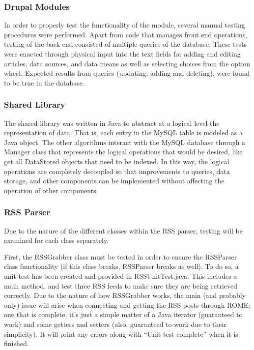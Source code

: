 \documentclass[11pt]{article} %
\begin{document}
\subsubsection{Drupal Modules}

In order to properly test the functionality of the module, several manual testing procedures were performed. Apart from code that manages front end operations, testing of the back end consisted of multiple queries of the database. These tests were enacted through physical input into the text fields for adding and editing articles, data sources, and data means as well as selecting choices from the option wheel. Expected results from queries (updating, adding and deleting), were found to be true in the database. 

\subsubsection{Shared Library}

The shared library was written in Java to abstract at a logical level the representation of data. That is, each entry in the MySQL table is modeled as a Java object. The other algorithms interact with the MySQL database through a Manager class that represents the logical operations that would be desired, like get all DataStored objects that need to be indexed. In this way, the logical operations are completely decoupled so that improvements to queries, data storage, and other components can be implemented without affecting the operation of other components.

\subsubsection{RSS Parser}

Due to the nature of the different classes within the RSS parser, testing will be examined for each class separately.

First, the RSSGrabber class must be tested in order to ensure the RSSParser class functionality (if this class breaks, RSSParser breaks as well). To do so, a unit test has been created and provided in RSSUnitTest.java. This includes a main method, and test three RSS feeds to make sure they are being retrieved correctly. Due to the nature of how RSSGrabber works, the main (and probably only) issue will arise when connecting and getting the RSS posts through ROME; one that is complete, it’s just a simple matter of a Java iterator (guaranteed to work) and some getters and setters (also, guaranteed to work due to their simplicity). It will print any errors along with “Unit test complete” when it is finished.
\end{document}
